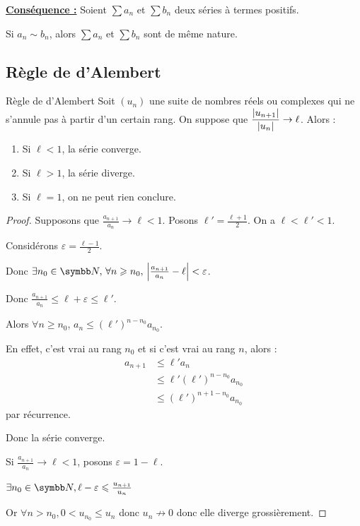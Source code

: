 \uline{\textbf{Conséquence :}} Soient $\sum a_n$ et $\sum b_n$ deux séries à termes positifs.

Si $a_n \sim b_n$, alors $\sum a_n$ et $\sum b_n$ sont de même nature.

\subsection{Règle de d'Alembert}

\begin{theoreme}{Règle de d'Alembert}{}
    Soit $(u_n)$ une suite de nombres réels ou complexes qui ne s'annule pas 
    à partir d'un certain rang. On suppose que $\displaystyle \frac{|u_{n + 1}|}{|u_n|} \to \ell$.
    Alors : 
    
    \begin{enumerate}
        \item Si $\ell < 1$, la série converge.
        \item Si $\ell > 1$, la série diverge.
        \item Si $\ell = 1$, on ne peut rien conclure.
    \end{enumerate}
\end{theoreme}


\begin{proof}
    Supposons que $\frac{a_{n + 1 }}{a_n } \longrightarrow \ell < 1$. Posons $\ell' = \frac {\ell+1} 2$. On a $\ell < \ell' < 1$.

    Considérons $\varepsilon = \frac{\ell - 1 } 2 $.

    Donc $\exists n_0 \in \N, \, \forall n \geqslant n_0, \, \abs{\frac{a_{n + 1}}{a_n} - \ell} < \varepsilon$.

    Donc $\frac{a_{n + 1}}{a_n} \leqslant \ell + \varepsilon \leqslant \ell'$.

    Alors $\displaystyle \forall n \geqslant n_0$, $\displaystyle a_n \leqslant (\ell')^{n-n_0} a_{n_0}$.

    En effet, c'est vrai au rang $n_0$ et si c'est vrai au rang $n$, 
    alors :
    \begin{align*}
        a_{n + 1} & \leqslant \ell' a_n \\
                  & \leqslant \ell' (\ell')^{n - n_0} a_{n_0} \\
                  & \leqslant (\ell')^{n + 1 - n_0} a_{n_0}
    \end{align*} par récurrence. 

    Donc la série converge.

    Si $\frac{a_{n + 1}}{a_n} \longrightarrow \ell < 1$, posons $\varepsilon = 1 - \ell$.

    $\exists n_0 \in \N, \ell - \varepsilon \leqslant \frac {u_{n+1}} {u_n}$

    Or $\forall n > n_0, 0 < u_{n_0} \leqslant u_n$  donc $u_n \not \to 0$ donc elle diverge grossièrement.
\end{proof}

